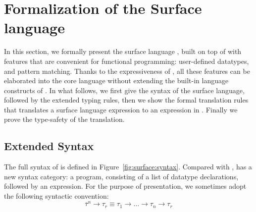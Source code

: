 \newcommand{\FV}{\mathsf{FV}}
\newcommand{\dom}{\mathsf{dom}}

\section{Formalization of the Surface language}
\label{sec:surface}


In this section, we formally present the surface language \sufcc,
built on top of \name with features that are convenient for functional
programming: user-defined datatypes, and pattern matching. Thanks to
the expressiveness of \name, all these features can be elaborated into
the core language without extending the built-in language constructs
of \name. In what follows, we first give the syntax of the surface
language, followed by the extended typing rules, then we show the
formal translation rules that translates a surface language expression
to an expression in \name. Finally we prove the type-safety of the
translation.

\subsection{Extended Syntax}


The full syntax of \sufcc is defined in
Figure~\ref{fig:surface:syntax}. Compared with \name, \sufcc has a new
syntax category: a program, consisting of a list of datatype
declarations, followed by an expression. For the purpose of
presentation, we sometimes adopt the following syntactic convention:
\[
\overline{\tau}^n \rightarrow \tau_r \equiv \tau_1 \rightarrow \dots \rightarrow \tau_n \rightarrow \tau_r
\]

